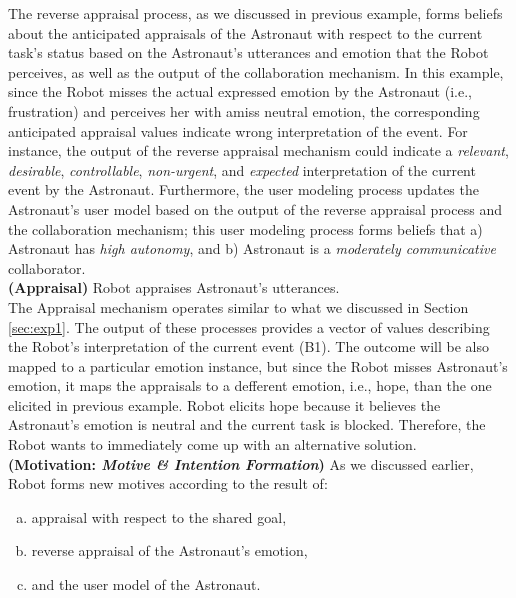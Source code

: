 The reverse appraisal process, as we discussed in previous example, forms
beliefs about the anticipated appraisals of the Astronaut with respect to the
current task's status based on the Astronaut's utterances and emotion that the
Robot perceives, as well as the output of the collaboration mechanism. In this
example, since the Robot misses the actual expressed emotion by the Astronaut
(i.e., frustration) and perceives her with amiss neutral emotion, the
corresponding anticipated appraisal values indicate wrong interpretation of the
event. For instance, the output of the reverse appraisal mechanism could
indicate a \textit{relevant}, \textit{desirable}, \textit{controllable},
\textit{non-urgent}, and \textit{expected} interpretation of the current event
by the Astronaut. Furthermore, the user modeling process updates the Astronaut's
user model based on the output of the reverse appraisal process and the
collaboration mechanism; this user modeling process forms beliefs that a)
Astronaut has \textit{high autonomy}, and b) Astronaut is a
\textit{moderately communicative} collaborator.\\

\noindent\textbf{(Appraisal)} Robot appraises Astronaut's utterances.\\

The Appraisal mechanism operates similar to what we discussed in Section
\ref{sec:exp1}. The output of these processes provides a vector of values
describing the Robot's interpretation of the current event (B1). The outcome
will be also mapped to a particular emotion instance, but since the Robot misses
Astronaut's emotion, it maps the appraisals to a defferent emotion, i.e.,
hope, than the one elicited in previous example. Robot elicits hope because it
believes the Astronaut's emotion is neutral and the current task is blocked.
Therefore, the Robot wants to immediately come up with an alternative
solution.\\

\noindent\textbf{(Motivation: \textit{Motive \& Intention Formation})} As
we discussed earlier, Robot forms new motives according to the result of:

\begin{enumerate}[a)]
  \item appraisal with respect to the shared goal,
  \item reverse appraisal of the Astronaut's emotion,
  \item and the user model of the Astronaut. 
\end{enumerate} 

